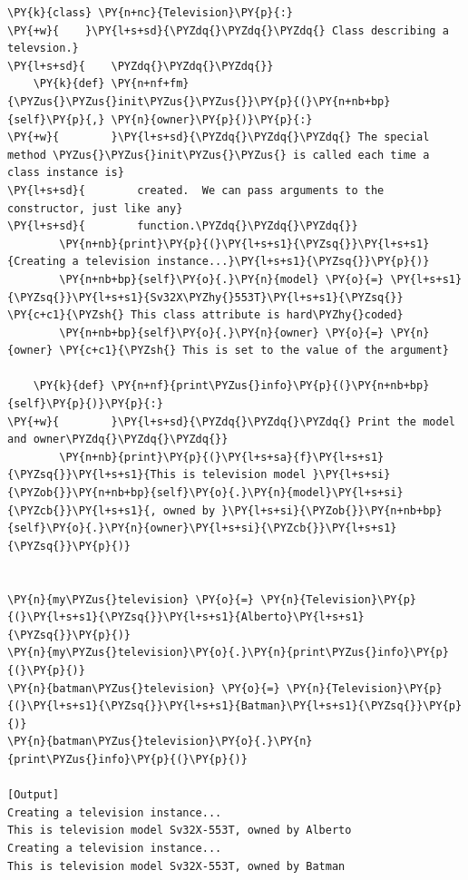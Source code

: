 \begin{Verbatim}[label=\makebox{\url{https://github.com/lucabaldini/cmepda/tree/master/slides/latex/snippets/class\_constructor.py}},commandchars=\\\{\}]
\PY{k}{class} \PY{n+nc}{Television}\PY{p}{:}
\PY{+w}{    }\PY{l+s+sd}{\PYZdq{}\PYZdq{}\PYZdq{} Class describing a televsion.}
\PY{l+s+sd}{    \PYZdq{}\PYZdq{}\PYZdq{}}
    \PY{k}{def} \PY{n+nf+fm}{\PYZus{}\PYZus{}init\PYZus{}\PYZus{}}\PY{p}{(}\PY{n+nb+bp}{self}\PY{p}{,} \PY{n}{owner}\PY{p}{)}\PY{p}{:}
\PY{+w}{        }\PY{l+s+sd}{\PYZdq{}\PYZdq{}\PYZdq{} The special method \PYZus{}\PYZus{}init\PYZus{}\PYZus{} is called each time a class instance is}
\PY{l+s+sd}{        created.  We can pass arguments to the constructor, just like any}
\PY{l+s+sd}{        function.\PYZdq{}\PYZdq{}\PYZdq{}}
        \PY{n+nb}{print}\PY{p}{(}\PY{l+s+s1}{\PYZsq{}}\PY{l+s+s1}{Creating a television instance...}\PY{l+s+s1}{\PYZsq{}}\PY{p}{)}
        \PY{n+nb+bp}{self}\PY{o}{.}\PY{n}{model} \PY{o}{=} \PY{l+s+s1}{\PYZsq{}}\PY{l+s+s1}{Sv32X\PYZhy{}553T}\PY{l+s+s1}{\PYZsq{}} \PY{c+c1}{\PYZsh{} This class attribute is hard\PYZhy{}coded}
        \PY{n+nb+bp}{self}\PY{o}{.}\PY{n}{owner} \PY{o}{=} \PY{n}{owner} \PY{c+c1}{\PYZsh{} This is set to the value of the argument}

    \PY{k}{def} \PY{n+nf}{print\PYZus{}info}\PY{p}{(}\PY{n+nb+bp}{self}\PY{p}{)}\PY{p}{:}
\PY{+w}{        }\PY{l+s+sd}{\PYZdq{}\PYZdq{}\PYZdq{} Print the model and owner\PYZdq{}\PYZdq{}\PYZdq{}}
        \PY{n+nb}{print}\PY{p}{(}\PY{l+s+sa}{f}\PY{l+s+s1}{\PYZsq{}}\PY{l+s+s1}{This is television model }\PY{l+s+si}{\PYZob{}}\PY{n+nb+bp}{self}\PY{o}{.}\PY{n}{model}\PY{l+s+si}{\PYZcb{}}\PY{l+s+s1}{, owned by }\PY{l+s+si}{\PYZob{}}\PY{n+nb+bp}{self}\PY{o}{.}\PY{n}{owner}\PY{l+s+si}{\PYZcb{}}\PY{l+s+s1}{\PYZsq{}}\PY{p}{)}


\PY{n}{my\PYZus{}television} \PY{o}{=} \PY{n}{Television}\PY{p}{(}\PY{l+s+s1}{\PYZsq{}}\PY{l+s+s1}{Alberto}\PY{l+s+s1}{\PYZsq{}}\PY{p}{)}
\PY{n}{my\PYZus{}television}\PY{o}{.}\PY{n}{print\PYZus{}info}\PY{p}{(}\PY{p}{)}
\PY{n}{batman\PYZus{}television} \PY{o}{=} \PY{n}{Television}\PY{p}{(}\PY{l+s+s1}{\PYZsq{}}\PY{l+s+s1}{Batman}\PY{l+s+s1}{\PYZsq{}}\PY{p}{)}
\PY{n}{batman\PYZus{}television}\PY{o}{.}\PY{n}{print\PYZus{}info}\PY{p}{(}\PY{p}{)}

[Output]
Creating a television instance...
This is television model Sv32X-553T, owned by Alberto
Creating a television instance...
This is television model Sv32X-553T, owned by Batman
\end{Verbatim}